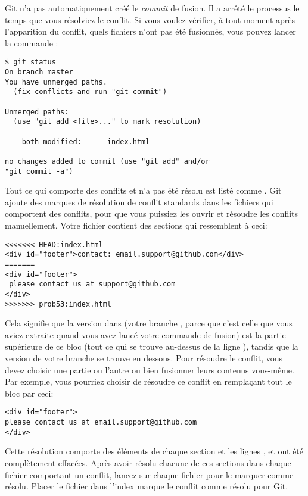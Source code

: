 Git n'a pas automatiquement créé le \emph{commit} de fusion.
Il a arrêté le processus le temps que vous résolviez le conflit.
Si vous voulez vérifier, à tout moment après l'apparition du conflit, quels fichiers n'ont pas été fusionnés, vous pouvez lancer la commande :
\begin{Schunk}
\begin{Verbatim}
$ git status
On branch master
You have unmerged paths.
  (fix conflicts and run "git commit")

Unmerged paths:
  (use "git add <file>..." to mark resolution)

    both modified:      index.html

no changes added to commit (use "git add" and/or
"git commit -a")
\end{Verbatim}
\end{Schunk}

Tout ce qui comporte des conflits et n'a pas été résolu est listé comme .
Git ajoute des marques de résolution de conflit standards dans les fichiers qui comportent des conflits, pour que vous puissiez les ouvrir et résoudre les conflits manuellement.
Votre fichier contient des sections qui ressemblent à ceci:
\begin{Schunk}
\begin{Verbatim}
<<<<<<< HEAD:index.html
<div id="footer">contact: email.support@github.com</div>
=======
<div id="footer">
 please contact us at support@github.com
</div>
>>>>>>> prob53:index.html
\end{Verbatim}
\end{Schunk}

Cela signifie que la version dans  (votre branche , parce que c'est celle que vous aviez extraite quand vous avez lancé votre commande de fusion) est la partie supérieure de ce bloc (tout ce qui se trouve au-dessus de la ligne \code{=======}), tandis que la version de votre branche  se trouve en dessous.
Pour résoudre le conflit, vous devez choisir une partie ou l'autre ou bien fusionner leurs contenus vous-même.
Par exemple, vous pourriez choisir de résoudre ce conflit en remplaçant tout le bloc par ceci:
\begin{Schunk}
\begin{Verbatim}
<div id="footer">
please contact us at email.support@github.com
</div>
\end{Verbatim}
\end{Schunk}

Cette résolution comporte des éléments de chaque section et les lignes \code{<<<<<<<}, \code{=======} et \code{>>>>>>>} ont été complètement effacées.
Après avoir résolu chacune de ces sections dans chaque fichier comportant un conflit, lancez  sur chaque fichier pour le marquer comme résolu.
Placer le fichier dans l'index marque le conflit comme résolu pour Git.

